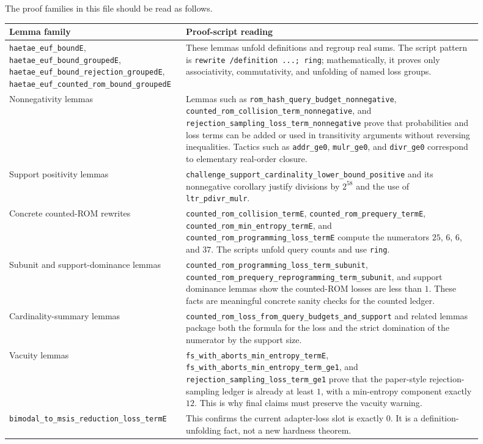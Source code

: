 \documentclass[11pt]{report}
\DeclareRobustCommand{\ec}[1]{\ifmmode\text{\nolinkurl{#1}}\else\nolinkurl{#1}\fi}
\theoremstyle{definition}
\theoremstyle{plain}
\begin{document}
The proof families in this file should be read as follows.

\begin{longtable}{p{0.30\linewidth}p{0.60\linewidth}}
\toprule
\textbf{Lemma family} & \textbf{Proof-script reading} \\
\midrule
\ec{haetae\_euf\_boundE},
\ec{haetae\_euf\_bound\_groupedE},
\ec{haetae\_euf\_bound\_rejection\_groupedE},
\ec{haetae\_euf\_counted\_rom\_bound\_groupedE} &
These lemmas unfold definitions and regroup real sums.  The script pattern is
\ec{rewrite /definition ...; ring}; mathematically, it proves only associativity,
commutativity, and unfolding of named loss groups. \\
Nonnegativity lemmas &
Lemmas such as \ec{rom\_hash\_query\_budget\_nonnegative},
\ec{counted\_rom\_collision\_term\_nonnegative}, and
\ec{rejection\_sampling\_loss\_term\_nonnegative} prove that probabilities and
loss terms can be added or used in transitivity arguments without reversing
inequalities.  Tactics such as \ec{addr\_ge0}, \ec{mulr\_ge0}, and
\ec{divr\_ge0} correspond to elementary real-order closure. \\
Support positivity lemmas &
\ec{challenge\_support\_cardinality\_lower\_bound\_positive} and its
nonnegative corollary justify divisions by \(2^{58}\) and the use of
\ec{ltr\_pdivr\_mulr}. \\
Concrete counted-ROM rewrites &
\ec{counted\_rom\_collision\_termE},
\ec{counted\_rom\_prequery\_termE},
\ec{counted\_rom\_min\_entropy\_termE}, and
\ec{counted\_rom\_programming\_loss\_termE} compute the numerators \(25\), \(6\),
\(6\), and \(37\).  The scripts unfold query counts and use \ec{ring}. \\
Subunit and support-dominance lemmas &
\ec{counted\_rom\_programming\_loss\_term\_subunit},
\ec{counted\_rom\_prequery\_reprogramming\_term\_subunit}, and support
dominance lemmas show the counted-ROM losses are less than \(1\).  These facts
are meaningful concrete sanity checks for the counted ledger. \\
Cardinality-summary lemmas &
\ec{counted\_rom\_loss\_from\_query\_budgets\_and\_support} and related lemmas
package both the formula for the loss and the strict domination of the numerator
by the support size. \\
Vacuity lemmas &
\ec{fs\_with\_aborts\_min\_entropy\_termE},
\ec{fs\_with\_aborts\_min\_entropy\_term\_ge1}, and
\ec{rejection\_sampling\_loss\_term\_ge1} prove that the paper-style
rejection-sampling ledger is already at least \(1\), with a min-entropy
component exactly \(12\).  This is why final claims must preserve the vacuity
warning. \\
\ec{bimodal\_to\_msis\_reduction\_loss\_termE} &
This confirms the current adapter-loss slot is exactly \(0\).  It is a
definition-unfolding fact, not a new hardness theorem. \\
\bottomrule
\end{longtable}
\end{document}
